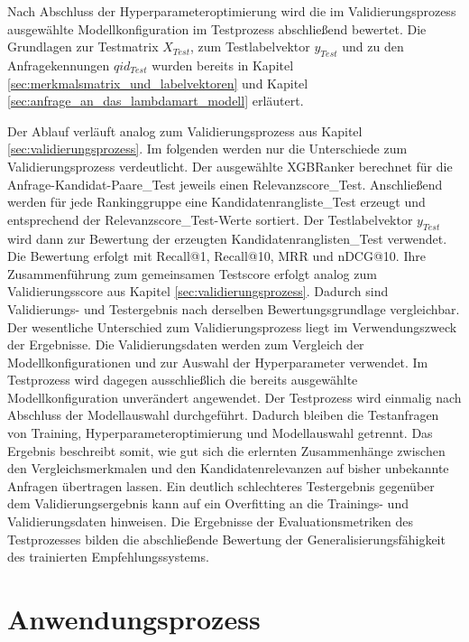 Nach Abschluss der Hyperparameteroptimierung wird die im Validierungsprozess ausgewählte Modellkonfiguration im Testprozess abschließend bewertet. 
Die Grundlagen zur Testmatrix \(X_{Test}\), zum Testlabelvektor \(y_{Test}\) und zu den Anfragekennungen \(qid_{Test}\) wurden bereits in Kapitel \ref{sec:merkmalsmatrix_und_labelvektoren} 
und Kapitel \ref{sec:anfrage_an_das_lambdamart_modell} erläutert. 

Der Ablauf verläuft analog zum Validierungsprozess aus Kapitel \ref{sec:validierungsprozess}. Im folgenden werden nur die Unterschiede zum Validierungsprozess verdeutlicht. 
Der ausgewählte XGBRanker berechnet für die Anfrage-Kandidat-Paare\_Test jeweils einen Relevanzscore\_Test. 
Anschließend werden für jede Rankinggruppe eine Kandidatenrangliste\_Test erzeugt und entsprechend der Relevanzscore\_Test-Werte sortiert. 
Der Testlabelvektor \(y_{Test}\) wird dann zur Bewertung der erzeugten Kandidatenranglisten\_Test verwendet. Die Bewertung erfolgt mit Recall@1, Recall@10, MRR und nDCG@10. 
Ihre Zusammenführung zum gemeinsamen Testscore erfolgt analog zum Validierungsscore aus Kapitel \ref{sec:validierungsprozess}. 
Dadurch sind Validierungs- und Testergebnis nach derselben Bewertungsgrundlage vergleichbar. Der wesentliche Unterschied zum Validierungsprozess liegt im Verwendungszweck der Ergebnisse. 
Die Validierungsdaten werden zum Vergleich der Modellkonfigurationen und zur Auswahl der Hyperparameter verwendet. Im Testprozess wird dagegen ausschließlich die bereits ausgewählte Modellkonfiguration unverändert angewendet. 
Der Testprozess wird einmalig nach Abschluss der Modellauswahl durchgeführt. Dadurch bleiben die Testanfragen von Training, Hyperparameteroptimierung und Modellauswahl getrennt. 
Das Ergebnis beschreibt somit, wie gut sich die erlernten Zusammenhänge zwischen den Vergleichsmerkmalen und den Kandidatenrelevanzen auf bisher unbekannte Anfragen übertragen lassen. 
Ein deutlich schlechteres Testergebnis gegenüber dem Validierungsergebnis kann auf ein Overfitting an die Trainings- und Validierungsdaten hinweisen. 
Die Ergebnisse der Evaluationsmetriken des Testprozesses bilden die abschließende Bewertung der Generalisierungsfähigkeit des trainierten Empfehlungssystems.

\section{Anwendungsprozess} 
\label{sec:anwendungsprozess_technische_umsetzung} 

